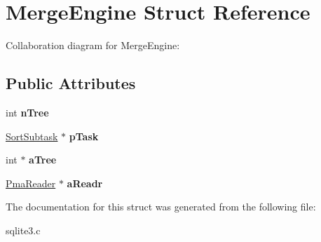 \hypertarget{structMergeEngine}{}\section{Merge\+Engine Struct Reference}
\label{structMergeEngine}


Collaboration diagram for Merge\+Engine\+:
\subsection*{Public Attributes}
\begin{DoxyCompactItemize}
\item 
int {\bfseries n\+Tree}\hypertarget{structMergeEngine_a48d8ad99ae5063e96458b5563ff2bbd3}{}\label{structMergeEngine_a48d8ad99ae5063e96458b5563ff2bbd3}

\item 
\hyperlink{structSortSubtask}{Sort\+Subtask} $\ast$ {\bfseries p\+Task}\hypertarget{structMergeEngine_a0a366796f579aa7befcb2683ff767c0d}{}\label{structMergeEngine_a0a366796f579aa7befcb2683ff767c0d}

\item 
int $\ast$ {\bfseries a\+Tree}\hypertarget{structMergeEngine_aac39bb928db1c72c48db263e0937b285}{}\label{structMergeEngine_aac39bb928db1c72c48db263e0937b285}

\item 
\hyperlink{structPmaReader}{Pma\+Reader} $\ast$ {\bfseries a\+Readr}\hypertarget{structMergeEngine_a897688db3212c8b3049a57cda6f2f975}{}\label{structMergeEngine_a897688db3212c8b3049a57cda6f2f975}

\end{DoxyCompactItemize}


The documentation for this struct was generated from the following file\+:\begin{DoxyCompactItemize}
\item 
sqlite3.\+c\end{DoxyCompactItemize}
